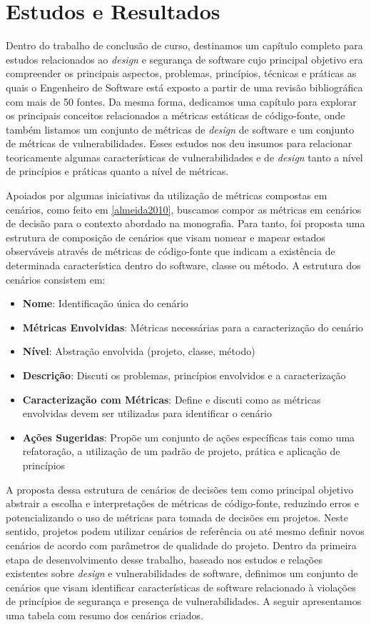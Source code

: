 \section{Estudos e Resultados}
\label{sec:studies}

Dentro do trabalho de conclusão de curso, destinamos um capítulo completo para estudos relacionados ao \emph{design} e segurança de software cujo principal objetivo era compreender os principais aspectos, problemas, princípios, técnicas e práticas as quais o Engenheiro de Software está exposto a partir de uma revisão bibliográfica com mais de 50 fontes. Da mesma forma, dedicamos uma capítulo para explorar os principais conceitos relacionados a métricas estáticas de código-fonte, onde também listamos um conjunto de métricas de \emph{design} de software e um conjunto de métricas de vulnerabilidades. Esses estudos nos deu insumos para relacionar teoricamente algumas características de vulnerabilidades e de \emph{design} tanto a nível de princípios e práticas quanto a nível de métricas.

Apoiados por algumas iniciativas da utilização de métricas compostas em cenários, como feito em \ref{almeida2010}, buscamos compor as métricas em cenários de decisão para o contexto abordado na monografia. Para tanto, foi proposta uma estrutura de composição de cenários que visam nomear e mapear estados observáveis através de métricas de código-fonte que indicam a existência de determinada característica dentro do software, classe ou método. A estrutura dos cenários consistem em:
\begin{itemize}
\item \textbf{Nome}: Identificação única do cenário
\item \textbf{Métricas Envolvidas}: Métricas necessárias para a caracterização do cenário
\item \textbf{Nível}: Abstração envolvida (projeto, classe, método)
\item \textbf{Descrição}: Discuti os problemas, princípios envolvidos e a caracterização
\item \textbf{Caracterização com Métricas}: Define e discuti como as métricas envolvidas devem ser utilizadas para identificar o cenário
\item \textbf{Ações Sugeridas}: Propõe um conjunto de ações específicas tais como uma refatoração, a utilização de um padrão de projeto, prática e aplicação de princípios
\end{itemize}

A proposta dessa estrutura de cenários de decisões tem como principal objetivo abstrair a escolha e interpretações de métricas de código-fonte, reduzindo erros e potencializando o uso de métricas para tomada de decisões em projetos. Neste sentido, projetos podem utilizar cenários de referência ou até mesmo definir novos cenários de acordo com parâmetros de qualidade do projeto. Dentro da primeira etapa de desenvolvimento desse trabalho, baseado nos estudos e relações existentes sobre \emph{design} e vulnerabilidades de software, definimos um conjunto de cenários que visam identificar características de software relacionado à violações de princípios de segurança e presença de vulnerabilidades. A seguir apresentamos uma tabela com resumo dos cenários criados.

